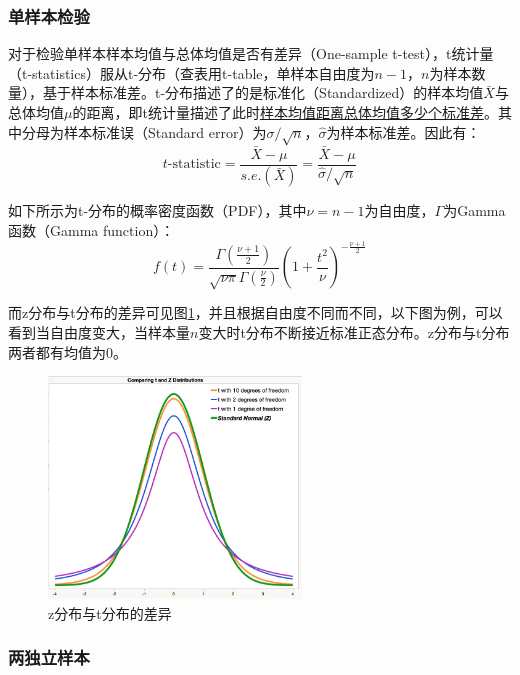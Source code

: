 \documentclass[11pt]{article}
\begin{document}
\subsubsection{单样本检验}

对于检验单样本样本均值与总体均值是否有差异（One-sample t-test），t统计量（t-statistics）服从t-分布（查表用t-table，单样本自由度为$n-1$，$n$为样本数量），基于样本标准差。t-分布描述了的是标准化（Standardized）的样本均值$\bar{X}$与总体均值$\mu$的距离，即t统计量描述了此时\uline{样本均值距离总体均值多少个标准差}。其中分母为样本标准误（Standard error）为$\sigma/\sqrt{n}$，$\hat{\sigma}$为样本标准差。因此有：
\begin{equation*}
    t\text{-statistic} = \frac{\bar{X}-\mu}{s.e.(\bar{X})} = \frac{\bar{X}-\mu}{\hat{\sigma}/\sqrt{n}}
\end{equation*}

如下所示为t-分布的概率密度函数（PDF），其中$\nu=n-1$为自由度，$\Gamma$为Gamma函数（Gamma function）：
\begin{equation*}
    f(t) = \frac{\Gamma\left( \frac{\nu+1}{2} \right)}{\sqrt{\nu\pi} \Gamma\left( \frac{\nu}{2} \right)} \left( 1+\frac{t^2}{\nu} \right)^{-\frac{\nu+1}{2}}
\end{equation*}

而z分布与t分布的差异可见图\ref{fig:z-and-t-dist}，并且根据自由度不同而不同，以下图为例，可以看到当自由度变大，当样本量$n$变大时t分布不断接近标准正态分布。z分布与t分布两者都有均值为$0$。
\begin{figure}[H]
    \centering
    \includegraphics[width=0.6\textwidth]{fig/z-dist-and-t-dist.png}
    \caption{z分布与t分布的差异}
    \label{fig:z-and-t-dist}
\end{figure}

\subsubsection{两独立样本}
\end{document}
